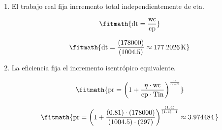 \begin{enumerate}

\item El trabajo real fija incremento total independientemente de eta.

\[\fitmath{\mathrm{dt}=\frac{\mathrm{wc}}{\mathrm{cp}}}\]

\[\fitmath{\mathrm{dt}=\frac{(178000)}{(1004.5)}\approx 177.2026\,\mathrm{K}}\]

\item La eficiencia fija el incremento isentrópico equivalente.

\[\fitmath{\mathrm{pr}={\left(1+\frac{\eta\cdot \mathrm{wc}}{\mathrm{cp}\cdot \mathrm{Tin}}\right)}^{\frac{\gamma}{\gamma-1}}}\]

\[\fitmath{\mathrm{pr}={\left(1+\frac{(0.81)\cdot (178000)}{(1004.5)\cdot (297)}\right)}^{\frac{(1.4)}{(1.4)-1}}\approx 3.974484\,}\]

\end{enumerate}
